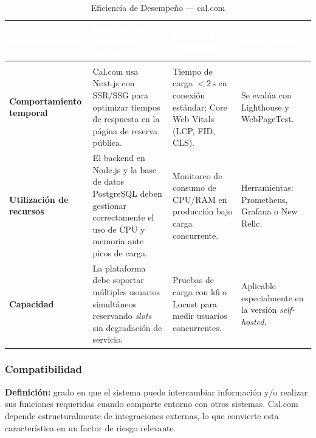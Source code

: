 \documentclass[12pt, a4paper]{article}
\newcommand{\rowpair}{\rowcolor{grisMedio}}
\newcommand{\rowimpar}{\rowcolor{grisClaro}}
\begin{document}
\begin{longtable}{>{\bfseries}p{3cm} p{4.5cm} p{4cm} p{3.5cm}}
\caption{Eficiencia de Desempeño — cal.com} \label{tab:desempeno} \\
\rowcolor{azulClaro}
\textcolor{white}{\textbf{Subcaracterística}} &
\textcolor{white}{\textbf{Descripción aplicada a cal.com}} &
\textcolor{white}{\textbf{Criterio de evaluación}} &
\textcolor{white}{\textbf{Observaciones}} \\
\endfirsthead
\multicolumn{4}{c}{\tablename\ \thetable{} -- continuación} \\
\endhead
\rowpair
Comportamiento temporal &
Cal.com usa Next.js con SSR/SSG para optimizar tiempos de respuesta en la página de
reserva pública. &
Tiempo de carga $< 2\,\text{s}$ en conexión estándar; Core Web Vitals (LCP, FID, CLS). &
Se evalúa con Lighthouse y WebPageTest. \\
\rowimpar
Utilización de recursos &
El backend en Node.js y la base de datos PostgreSQL deben gestionar correctamente el
uso de CPU y memoria ante picos de carga. &
Monitoreo de consumo de CPU/RAM en producción bajo carga concurrente. &
Herramientas: Prometheus, Grafana o New Relic. \\
\rowpair
Capacidad &
La plataforma debe soportar múltiples usuarios simultáneos reservando \textit{slots} sin
degradación de servicio. &
Pruebas de carga con k6 o Locust para medir usuarios concurrentes. &
Aplicable especialmente en la versión \textit{self-hosted}. \\
\end{longtable}

\subsubsection{Compatibilidad}

\textbf{Definición:} grado en que el sistema puede intercambiar información y/o realizar
sus funciones requeridas cuando comparte entorno con otros sistemas. Cal.com depende
estructuralmente de integraciones externas, lo que convierte esta característica en un
factor de riesgo relevante.
\end{document}
